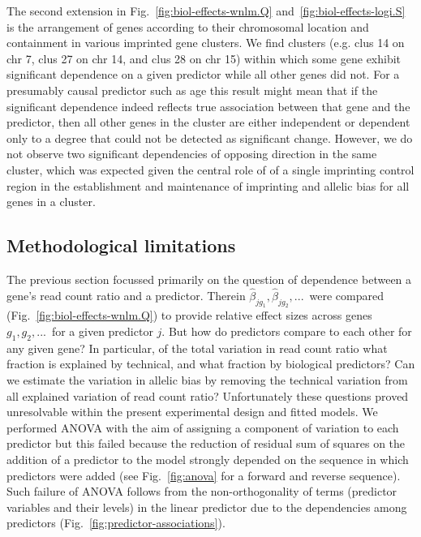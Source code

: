 \documentclass[12pt,letterpaper]{article}
\begin{document}
The second extension in Fig.~\ref{fig:biol-effects-wnlm.Q}
and~\ref{fig:biol-effects-logi.S} is the arrangement of genes according to
their chromosomal location and containment in various imprinted gene clusters.
We find clusters (e.g. clus 14 on chr 7, clus 27 on chr 14, and clus 28 on
chr 15) within which some gene exhibit significant dependence on a given
predictor while all other genes did not. For a presumably causal predictor such
as age this result might mean that if the significant dependence indeed
reflects true association between that gene and the predictor, then all other
genes in the cluster are either independent or dependent only to a degree that
could not be detected as significant change. However, we do not observe two
significant dependencies of opposing direction in the same cluster, which was
expected given the central role of of a single imprinting control region in
the establishment and maintenance of imprinting and allelic bias for all
genes in a cluster.

\subsection{Methodological limitations}
\label{sec:limitations}

The previous section focussed primarily on the question of dependence between
a gene's read count ratio and a predictor.  Therein \(\hat\beta_{jg_1},
\hat\beta_{jg_2},...\)~were compared (Fig.~\ref{fig:biol-effects-wnlm.Q}) to
provide relative effect sizes across genes \(g_1, g_2,...\)~for a given
predictor \(j\). But how do predictors compare to each other for any given
gene? In particular, of the total variation in read count ratio what fraction
is explained by technical, and what fraction by biological predictors? Can we
estimate the variation in allelic bias by removing the technical variation
from all explained variation of read count ratio?  Unfortunately these
questions proved unresolvable within the present experimental design and
fitted models. We performed ANOVA with the aim of assigning a component of
variation to each predictor but this failed because the reduction of residual
sum of squares on the addition of a predictor to the model strongly depended
on the sequence in which predictors were added (see Fig.~\ref{fig:anova} for a
forward and reverse sequence). Such failure of ANOVA follows from
the non-orthogonality of terms (predictor variables and their levels) in the
linear predictor due to the dependencies among predictors
(Fig.~\ref{fig:predictor-associations}).
\end{document}
